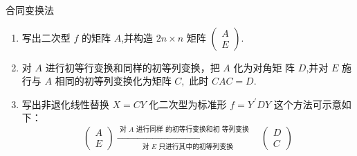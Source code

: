 \documentclass[13pt]{beamer}
\begin{document}
\begin{frame}{合同变换法}
\begin{enumerate}
\item 写出二次型 $f$ 的矩阵 $A$,并构造 $2 n \times n$ 矩阵 $\left(\begin{array}{c}A \\ E\end{array}\right)$.

\item  对 $A$ 进行初等行变换和同样的初等列变换，把 $A$ 化为对角矩 阵
$D$,并对 $E$ 施行与 $A$ 相同的初等列变换化为矩阵 $C,$ 此时 $C A C=D$.

\item  写出非退化线性替换 $X=C Y$ 化二次型为标准形 $f=Y^{\, \prime} D Y$
这个方法可示意如下：
\[
\left(\begin{array}{c}
A \\
E
\end{array}\right) 
\xrightarrow[\text{ 对 } E \text{ 只进行其中的初等列变换 }]{\text{ 对 } A \text{ 进行同样 的初等行变换和初 等列变换 }\quad }
\left(\begin{array}{c}
D \\
C
\end{array}\right)
\]
\end{enumerate}
\end{frame}
\end{document}
